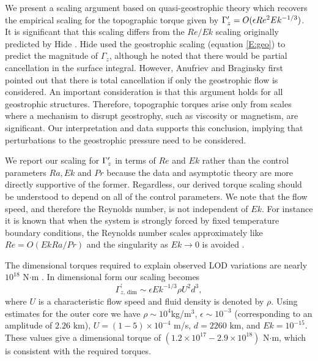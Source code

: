 \textcolor{\revtxt}{We present a scaling argument based on quasi-geostrophic theory \cite{mS06,mC13} which recovers the empirical scaling for the topographic torque given by ${ {\Gamma}^{\prime}_z } =O( \epsilon  Re^{2}Ek^{-1/3})$.}
\textcolor{\revtxt}{It is significant that this scaling differs from the $Re/Ek$ scaling originally predicted by Hide \citep{rH69}. 
	Hide used the geostrophic scaling (equation \ref{E:geo}) to predict the magnitude of $\Gamma_{z}$, although he noted that there would be partial cancellation in the surface integral. However, Anufriev and Braginsky \citep{aA77b} first pointed out that there is total cancellation if only the geostrophic flow is considered. An important consideration is that this argument holds for all geostrophic structures. Therefore, topographic torques arise only from scales where a mechanism to disrupt geostrophy, such as viscosity or magnetism, are significant. Our interpretation and data supports this conclusion, implying that perturbations to the geostrophic pressure need to be considered. 
}

\textcolor{\revtxt}{We report our scaling for ${ {\Gamma}^{\prime}_z }$ in terms of $Re$ and $Ek$ rather than the control parameters $Ra,Ek$ and $Pr$ because the data and asymptotic theory are more directly supportive of the former. Regardless,} our derived torque scaling should be understood to depend on all of the control parameters. 
We note that the flow speed, and therefore the Reynolds number, is not independent of $Ek$. For instance it is known that when the system is strongly forced by fixed temperature boundary conditions, the Reynolds number scales approximately like $Re =O( Ek Ra/Pr)$ and the singularity as $Ek\to 0$ is avoided \citep{tO23}. 

The dimensional torques required to explain observed \textcolor{\revtxt}{LOD} variations are nearly $10^{18}$ N$\cdot$m \citep{pR12}. In dimensional form our scaling becomes 
\begin{equation}	
	\Gamma^\prime_{z\text{, dim}} \sim \epsilon Ek^{-1/3}  \rho   U^{2}d^{3},
	\label{e:25Gamma_dim}
\end{equation}
where $U$ is a characteristic flow speed and fluid density is denoted by $\rho$. 
Using estimates for the outer core we have $\rho  \sim 10^{4}$kg/m$^{3}$, $\epsilon \sim 10^{-3}$ (corresponding to an amplitude of $2.26$ km), $U = (1-5)\times 10^{-4}$ m/s,  $d = 2260$ km, and $Ek = 10^{-15}$. These values give a dimensional torque of $(1.2\times 10^{17}-2.9\times 10^{18})$ N$\cdot$m, which is consistent with the required torques.

